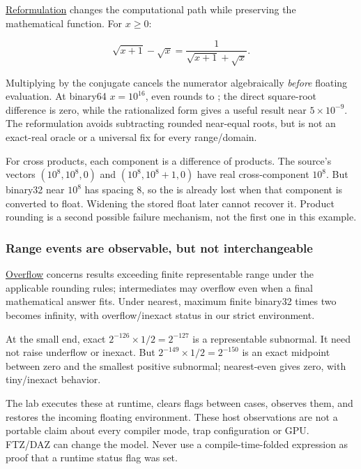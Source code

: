\hyperref[appendix-d7f8ba961670]{Reformulation} changes the computational path while preserving the mathematical function. For \(x\ge0\):

\[
\sqrt{x+1}-\sqrt{x}
=\frac{1}{\sqrt{x+1}+\sqrt{x}}.
\]

Multiplying by the conjugate cancels the numerator algebraically \emph{before} floating evaluation. At binary64 \(x=10^{16}\), even  rounds to ; the direct square-root difference is zero, while the rationalized form gives a useful result near \(5\times10^{-9}\). The reformulation avoids subtracting rounded near-equal roots, but is not an exact-real oracle or a universal fix for every range/domain.

For cross products, each component is a difference of products. The source's vectors \((10^8,10^8,0)\) and \((10^8,10^8+1,0)\) have real cross-component \(10^8\). But binary32 near \(10^8\) has spacing 8, so the  is already lost when that component is converted to float. Widening the stored float later cannot recover it. Product rounding is a second possible failure mechanism, not the first one in this example.

\subsubsection{Range events are observable, but not interchangeable}\label{01-foundations-i-ch001-range-events-are-observable-but-not-interchangeable}

\hypertarget{01-foundations-i-ch001-range-events-are-observable-but-not-interchangeable}{}

\hyperref[appendix-ed8531b46754]{Overflow} concerns results exceeding finite representable range under the applicable rounding rules; intermediates may overflow even when a final mathematical answer fits. Under nearest, maximum finite binary32 times two becomes infinity, with overflow/inexact status in our strict environment.

At the small end, exact \(2^{-126}\times1/2=2^{-127}\) is a representable subnormal. It need not raise underflow or inexact. But \(2^{-149}\times1/2=2^{-150}\) is an exact midpoint between zero and the smallest positive subnormal; nearest-even gives zero, with tiny/inexact behavior.

The lab executes these at runtime, clears flags between cases, observes them, and restores the incoming floating environment. These host observations are not a portable claim about every compiler mode, trap configuration or GPU. FTZ/DAZ can change the model. Never use a compile-time-folded expression as proof that a runtime status flag was set.

